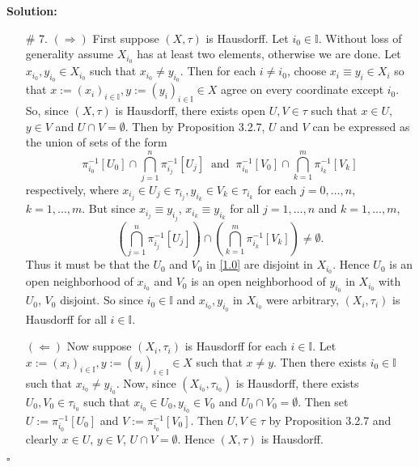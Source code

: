 \documentclass[12pt]{article}
\newcounter{ProofCounter}
\newenvironment{Solution}{\stepcounter{ProofCounter}\textbf{Solution:}}{\hfill$\square$}
\begin{document}
\begin{Solution}
\begin{enumerate}
    \item[\# 7.] $(\Rightarrow)$ First suppose $(X, \tau)$ is Hausdorff. Let $i_0 \in \mathbb{I}$. Without loss of generality assume $X_{i_0}$ has at
      least two elements, otherwise we are done.
      Let $x_{i_0}, y_{i_0} \in X_{i_0}$ such that $x_{i_0} \neq y_{i_0}$. Then for each $i \neq i_{0}$, choose $x_i \equiv y_i \in X_i$ so that 
      $x := \left( x_i \right)_{i\in\mathbb{I}}, y := \left( y_i \right)_{i\in\mathbb{I}} \in X$ agree on every coordinate except $i_0$.
      So, since $(X, \tau)$ is Hausdorff, there exists open $U,V \in \tau$ such that $x \in U$, $y \in V$ and $U \cap V = \emptyset$. Then by Proposition
      3.2.7, $U$ and $V$ can be expressed as the union of sets of the form
      \begin{equation}
        \pi_{i_0}^{-1}[U_{0}] \cap \bigcap_{j=1}^{n} \pi_{i_j}^{-1}[U_j]   \ \text{ and }\ 
        \pi_{i_0}^{-1}[V_{0}] \cap \bigcap_{k=1}^{m} \pi_{i_k}^{-1}[V_k]
        \label{1.0}
      \end{equation}
      respectively, where $x_{i_j} \in U_j \in \tau_{i_j}, y_{i_k} \in V_{k} \in \tau_{i_k}$ for each $j = 0,\dots, n$, $k = 1,\dots,m$.
      But since $x_{i_j} \equiv y_{i_j}$, $x_{i_k} \equiv y_{i_k}$ for all $j = 1, \dots, n$ and $k = 1,\dots, m$, 
      \[
        \left( \bigcap_{j=1}^{n}\pi_{i_j}^{-1}[U_j] \right) \cap \left( \bigcap_{k=1}^{m}\pi_{i_k}^{-1}[V_k] \right) \neq \emptyset.
      \]
      Thus it must be that the $U_0$ and $V_0$ in \eqref{1.0} are disjoint in $X_{i_0}$.
      Hence $U_0$ is an open neighborhood of $x_{i_0}$ and $V_0$ is an open neighborhood of $y_{i_0}$ in $X_{i_0}$ with $U_0$, $V_0$ disjoint.
      So since $i_0 \in \mathbb{I}$ and $x_{i_0}, y_{i_0}$ in $X_{i_0}$ were arbitrary, $(X_i, \tau_i)$ is Hausdorff for all $i \in \mathbb{I}$.

      $(\Leftarrow)$ Now suppose $(X_i, \tau_i)$ is Hausdorff for each $i \in \mathbb{I}$. Let $x := (x_i)_{i\in\mathbb{I}}, y := \left( y_i
      \right)_{i\in\mathbb{I}} \in X$ such that $x \neq y$. Then there exists $i_0 \in \mathbb{I}$ such that $x_{i_0} \neq y_{i_0}$. Now, since $(X_{i_0}, \tau_{i_0})$ is
      Hausdorff, there exists $U_{0}, V_{0} \in \tau_{i_0}$ such that $x_{i_0} \in U_{0}, y_{i_0} \in V_0$ and $U_0 \cap V_0 = \emptyset$.
      Then set $U := \pi_{i_0}^{-1}[U_0]$ and $V := \pi_{i_0}^{-1}[V_0]$. Then $U,V \in \tau$ by Proposition 3.2.7 and clearly $x \in U$, $y \in V$,
      $U\cap V = \emptyset$. Hence $(X,\tau)$ is Hausdorff.


\end{enumerate}
\end{Solution}
\end{document}
